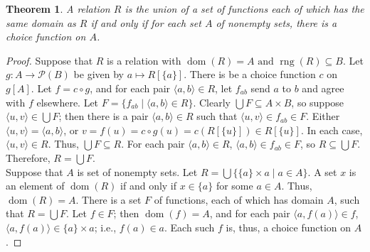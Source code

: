 \documentclass[12pt]{article}
\DeclareMathOperator{\dom}{dom}
\DeclareMathOperator{\rng}{rng}
\begin{document}
\newtheorem*{theorem}{Theorem}

\begin{theorem}
A relation $R$ is the union of a set of functions each of which
has the same domain as $R$ if and only if for each set $A$ of
nonempty sets, there is a choice function on $A$.
\end{theorem}
\begin{proof}
Suppose that $R$ is a relation with $\dom(R) = A \mbox{ and }
\rng(R) \subseteq B$. Let $g \colon A \to \mathcal{P}(B)$ be given
by $a \mapsto R\left[\{a\}\right]$. There is be a choice function
$c$ on $g\left[A\right]$. Let $f = c \circ g$, and for each pair
$\langle a,b\rangle \in R$, let $f_{ab}$ send $a$ to $b$ and agree
with $f$ elsewhere. Let $F = \{f_{ab}\mid \langle a,b \rangle \in
R\}$. Clearly $\bigcup F \subseteq A \times B$, so suppose
$\langle u,v \rangle \in \bigcup F$; then there is a pair $\langle
a,b\rangle \in R$ such that $\langle u,v \rangle \in f_{ab} \in
F$. Either $\langle u,v \rangle = \langle a,b\rangle$, or $v =
f(u) = c \circ g(u) = c(R\left[\{u\}\right]) \in
R\left[\{u\}\right]$. In each case, $\langle u,v \rangle \in R$.
Thus, $\bigcup F \subseteq R.$ For each pair $\langle a,b\rangle
\in R$, $\langle a,b\rangle \in f_{ab} \in F$, so $R \subseteq
\bigcup F$. Therefore, $R = \bigcup F$.
\\
Suppose that $A$ is  set of nonempty sets. Let $R = \bigcup
\{\{a\} \times a \mid a \in A \}$. A set $x$ is an element of $
\dom(R)$ if and only if $x \in \{a\}$ for some $a \in A$. Thus,
$\dom(R) = A$. There is a set $F$ of functions, each of which has
domain $A$, such that $R = \bigcup F$. Let $f \in F$; then
$\dom(f) = A$, and for each pair $\langle a,f(a)\rangle \in f$,
$\langle a,f(a)\rangle \in \{a\} \times a$; i.e., $f(a) \in a$.
Each such $f$ is, thus, a choice function on $A$.
\end{proof}

\end{document}
